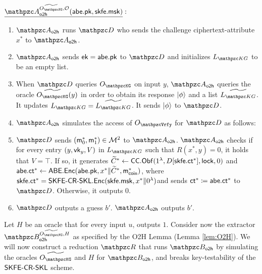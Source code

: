 \begin{description}
\item $\underline{\qA_\oh^{\widetilde{\Oracle{\qKG}}, \cO}(\abe.\pk,
\skfe.\msk)}:$
\begin{enumerate}
\item $\qA_\oh$ runs $\qD$ who sends the challenge ciphertext-attribute
$x^*$ to $\qA_\oh$.
\item $\qA_\oh$ sends $\mathsf{ek} = \mathsf{abe}.\mathsf{pk}$ to $\qD$ and initializes $L_{\qKG}$
to be an empty list.
\item When $\qD$ queries $\Oracle{\qKG}$ on input $y$, $\qA_\oh$ queries
the oracle $\widetilde{\Oracle{\qKG}}(y)$ in order to obtain its
response $\ket{\phi}$ and a list $\widetilde{L_{\qKG}}$. It updates
$L_{\qKG} = \widetilde{L_{\qKG}}$. It sends $\ket{\phi}$ to $\qD$.
\item $\qA_\oh$ simulates the access of $\Oracle{\qVrfy}$ for $\qD$ as
follows:

\item $\qD$ sends $(\mathsf{m}_0^*, \mathsf{m}_1^*) \in \mathcal{M}^2$ to $\qA_\oh$. $\qA_\oh$ checks if
for every entry $(y, \mathsf{vk}_y, V)$ in $L_{\qKG}$ such that $R(x^*, y) =0$, it holds that $V = \top$. If so, it generates
$\widetilde{C}^*\leftarrow\mathsf{CC}.\mathsf{Obf}(1^\lambda,D[\mathsf{skfe}.\mathsf{ct}^*], \mathsf{lock}, 0)$
 and $\mathsf{abe}.\mathsf{ct}^* \leftarrow \mathsf{ABE}.\mathsf{Enc}(\mathsf{abe}.\mathsf{pk}, x^* \|
\widetilde{C}^*, \mathsf{m}^*_{\mathsf{coin}})$, where $\mathsf{skfe}.\mathsf{ct}^* = \mathsf{SKFE}\textrm{-}\mathsf{CR}\textrm{-}\mathsf{SKL}.\mathsf{Enc}(\mathsf{skfe}.\mathsf{msk},
x^* \| 0^\lambda) $and sends $\mathsf{ct}^* \coloneqq \mathsf{abe}.\mathsf{ct}^*$ to $\qD$.
Otherwise, it outputs $0$.
\item $\qD$ outputs a guess $b'$. $\qA_\oh$ outputs $b'$.
\end{enumerate}
\end{description}

Let $H$ be an oracle that for every input $u$, outputs $1$.
Consider now the extractor $\qB_\oh^{\widetilde{\Oracle{\qKG}}, H}$
as specified by the O2H Lemma (Lemma \ref{lem:O2H}). We will now
construct a reduction $\qR$ that runs $\qB_\oh$ by simulating the oracles
$\widetilde{\Oracle{\qKG}}$ and $H$ for $\qB_\oh$, and breaks
key-testability of the $\mathsf{SKFE}\textrm{-}\mathsf{CR}\textrm{-}\mathsf{SKL}$ scheme.

